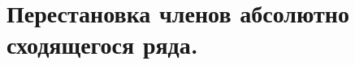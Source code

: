 \documentclass[../main.tex]{subfiles}
\begin{document}
\newpage
\section{Перестановка членов абсолютно сходящегося ряда.}
\end{document}
